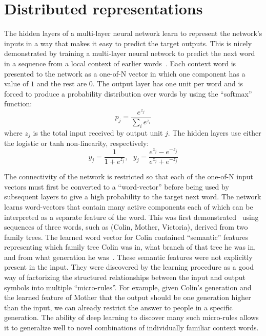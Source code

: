 \documentclass[]{article}
\begin{document}
\section{Distributed representations}

The hidden layers of a multi-layer neural network learn to represent the
network's inputs in a way that makes it easy to predict the target
outputs. This is nicely demonstrated by training a multi-layer neural
network to predict the next word in a sequence from a local context of
earlier words~\citep{BenDucVin01-short}. 
Each context word is presented to the network as a one-of-N
vector in which one component has a value of $1$ and the rest are $0$. The
output layer has one unit per word and is forced to produce a probability
distribution over words by using the ``softmax'' function:
\begin{equation}
p_j = \frac{e^{z_j}}{\sum_i e^{z_i}}
\end{equation}
where $z_j$ is the total input received by output unit $j$. The hidden
layers use either the logistic or tanh non-linearity, respectively:
\begin{equation}
y_j = \frac{1}{1+ e^{z_j}}, \ \ \ y_j = \frac{e^{z_j}-e^{-z_j}}{e^{z_j}+e^{-z_j}} %
\end{equation}

The connectivity of the network is restricted so that each of the one-of-N
input vectors must first be converted to a ``word-vector'' before being
used by subsequent layers to give a high probability to the target next
word.  The network learns word-vectors that contain many active components
each of which can be interpreted as a separate feature of the word. This
was first demonstrated~\citep{RHW} using sequences of three words, such as
(Colin, Mother, Victoria), derived from two family trees. The learned word
vector for Colin contained ``semantic'' features representing which family
tree Colin was in, what branch of that tree he was in, and from what generation
he was~\citep{Hinton-et-al-PDP1986}. These semantic features were not explicitly present
in the input.  They were discovered by the learning procedure as a good way
of factorizing the structured relationships between the input and output
symbols into multiple ``micro-rules''.  For example, given Colin's
generation and the learned feature of Mother that the output should be one
generation higher than the input, we can already restrict the answer to
people in a specific generation. The ability of deep learning to discover
many such micro-rules allows it to generalize well to novel combinations of
individually familiar context words.
\end{document}
